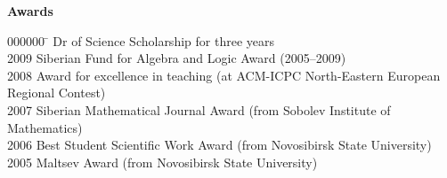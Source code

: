 \documentclass[12pt]{article}
\begin{document}
\centerline{\bf Awards}
\begin{tabbing}
000000	\=		\> Dr of Science Scholarship for three years\\
\iftoggle{full}{
	\> (This Award is a Russian analogue of New Zealand's Rutherford Discovery Fellowship)\\
}{}
2009	\> Siberian Fund for Algebra and Logic Award (2005--2009)\\
2008	\> Award for excellence in teaching (at ACM-ICPC North-Eastern European Regional Contest)\\
2007	\> Siberian Mathematical Journal Award (from Sobolev Institute of Mathematics)\\
2006	\> Best Student Scientific Work Award (from Novosibirsk State University)\\
2005	\> Maltsev Award (from Novosibirsk State University)\\
\end{tabbing}
\end{document}
